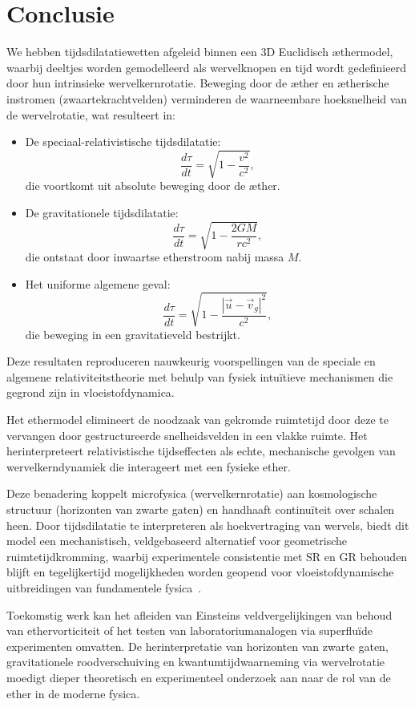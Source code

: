 \section{Conclusie}

We hebben tijdsdilatatiewetten afgeleid binnen een 3D Euclidisch æthermodel, waarbij deeltjes worden gemodelleerd als wervelknopen en tijd wordt gedefinieerd door hun intrinsieke wervelkernrotatie. Beweging door de æther en ætherische instromen (zwaartekrachtvelden) verminderen de waarneembare hoeksnelheid van de wervelrotatie, wat resulteert in:

\begin{itemize}
    \item De speciaal-relativistische tijdsdilatatie:
    \[
        \frac{d\tau}{dt} = \sqrt{1 - \frac{v^2}{c^2}},
    \]
    die voortkomt uit absolute beweging door de æther.

    \item De gravitationele tijdsdilatatie:
    \[
        \frac{d\tau}{dt} = \sqrt{1 - \frac{2GM}{rc^2}},
    \]
    die ontstaat door inwaartse etherstroom nabij massa $M$.

    \item Het uniforme algemene geval:
    \[
        \frac{d\tau}{dt} = \sqrt{1 - \frac{|\vec{u} - \vec{v}_g|^2}{c^2}},
    \]
    die beweging in een gravitatieveld bestrijkt.
\end{itemize}

Deze resultaten reproduceren nauwkeurig voorspellingen van de speciale en algemene relativiteitstheorie met behulp van fysiek intuïtieve mechanismen die gegrond zijn in vloeistofdynamica.

Het ethermodel elimineert de noodzaak van gekromde ruimtetijd door deze te vervangen door gestructureerde snelheidsvelden in een vlakke ruimte. Het herinterpreteert relativistische tijdseffecten als echte, mechanische gevolgen van wervelkerndynamiek die interageert met een fysieke ether.

Deze benadering koppelt microfysica (wervelkernrotatie) aan kosmologische structuur (horizonten van zwarte gaten) en handhaaft continuïteit over schalen heen. Door tijdsdilatatie te interpreteren als hoekvertraging van wervels, biedt dit model een mechanistisch, veldgebaseerd alternatief voor geometrische ruimtetijdkromming, waarbij experimentele consistentie met SR en GR behouden blijft en tegelijkertijd mogelijkheden worden geopend voor vloeistofdynamische uitbreidingen van fundamentele fysica~\cite{Winterberg2002-PlanckAether,Schiller2022-maxforce}.

Toekomstig werk kan het afleiden van Einsteins veldvergelijkingen van behoud van ethervorticiteit of het testen van laboratoriumanalogen via superfluïde experimenten omvatten. De herinterpretatie van horizonten van zwarte gaten, gravitationele roodverschuiving en kwantumtijdwaarneming via wervelrotatie moedigt dieper theoretisch en experimenteel onderzoek aan naar de rol van de ether in de moderne fysica.